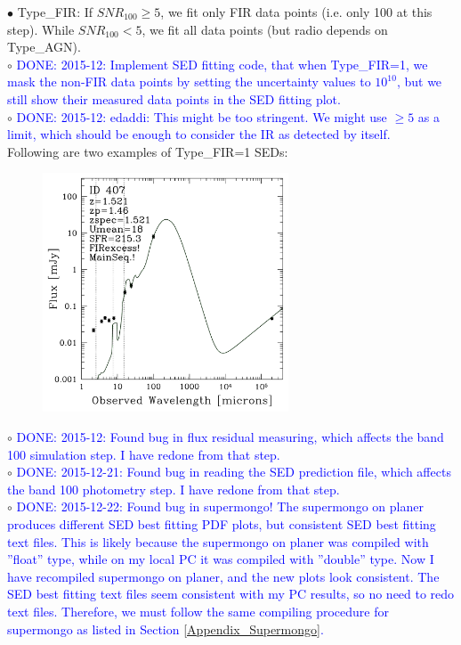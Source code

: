 \documentclass[11pt,a4paper]{article}
\begin{document}
\indent\hspace{15pt}$\bullet$ 
Type\_FIR: If $SNR_{100} \ge 5$, we fit only FIR data points (i.e. only 100 at this step). While $SNR_{100} < 5$, we fit all data points (but radio depends on Type\_AGN).
\\
\indent\hspace{15pt}$\circ$ 
\textcolor{blue}{DONE: 2015-12: Implement SED fitting code, that when Type\_FIR=1, we mask the non-FIR data points by setting the uncertainty values to $10^{10}$, but we still show their measured data points in the SED fitting plot. }
\\
\indent\hspace{15pt}$\circ$ 
\textcolor{blue}{DONE: 2015-12: edaddi: This might be too stringent. We might use $\ge 5$ as a limit, which should be enough to consider the IR as detected by itself.}
\\

Following are two examples of Type\_FIR=1 SEDs: 

\begin{figure}[H]
	\includegraphics[width=0.65\textwidth]{galsed_160_Plot_SED_407}
\end{figure}

\indent\hspace{15pt}$\circ$ 
\textcolor{blue}{DONE: 2015-12: Found bug in flux residual measuring, which affects the band 100 simulation step. I have redone from that step.}
\\
\indent\hspace{15pt}$\circ$ 
\textcolor{blue}{DONE: 2015-12-21: Found bug in reading the SED prediction file, which affects the band 100 photometry step. I have redone from that step.}
\\
\indent\hspace{15pt}$\circ$ 
\textcolor{blue}{DONE: 2015-12-22: Found bug in supermongo! The supermongo on planer produces different SED best fitting PDF plots, but consistent SED best fitting text files. This is likely because the supermongo on planer was compiled with ''float'' type, while on my local PC it was compiled with ''double'' type. Now I have recompiled supermongo on planer, and the new plots look consistent. The SED best fitting text files seem consistent with my PC results, so no need to redo text files. Therefore, we must follow the same compiling procedure for supermongo as listed in Section \ref{Appendix_Supermongo}.}
\\
\end{document}
